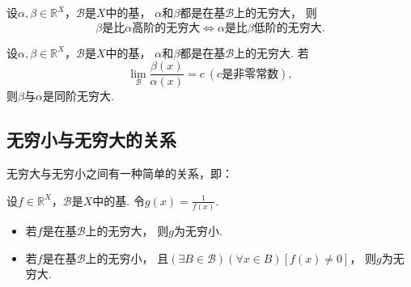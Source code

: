 \begin{proposition}
设\(\alpha,\beta\in\mathbb{R}^X\)，\(\mathcal{B}\)是\(X\)中的基，
\(\alpha\)和\(\beta\)都是在基\(\mathcal{B}\)上的无穷大，
则\begin{equation*}
	\text{\(\beta\)是比\(\alpha\)高阶的无穷大}
	\iff
	\text{\(\alpha\)是比\(\beta\)低阶的无穷大}.
\end{equation*}
\end{proposition}

\begin{proposition}
设\(\alpha,\beta\in\mathbb{R}^X\)，\(\mathcal{B}\)是\(X\)中的基，
\(\alpha\)和\(\beta\)都是在基\(\mathcal{B}\)上的无穷大.
若\begin{equation*}
	\lim_\mathcal{B} \frac{\beta(x)}{\alpha(x)} = c\ (\text{$c$是非零常数}),
\end{equation*}
则\(\beta\)与\(\alpha\)是同阶无穷大.
\end{proposition}

\subsection{无穷小与无穷大的关系}
无穷大与无穷小之间有一种简单的关系，即：
\begin{theorem}\label{theorem:极限.无穷大与无穷小的关系}
设\(f\in\mathbb{R}^X\)，\(\mathcal{B}\)是\(X\)中的基.
令\(g(x) = \frac1{f(x)}\).
\begin{itemize}
	\item 若\(f\)是在基\(\mathcal{B}\)上的无穷大，
	则\(g\)为无穷小.

	\item 若\(f\)是在基\(\mathcal{B}\)上的无穷小，
	且\((\exists B\in\mathcal{B})(\forall x\in B)[f(x) \neq 0]\)，
	则\(g\)为无穷大.
\end{itemize}
\end{theorem}

